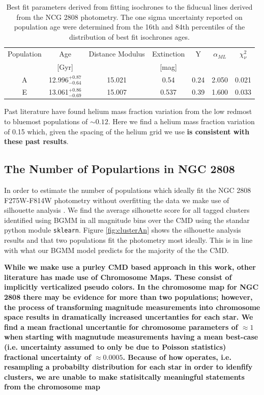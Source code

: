 \begin{table}
  \centering
  \begin{tabular}{c | c c c c c c}
    \hline
    Population & Age & Distance Modulus & Extinction & Y & $\alpha_{ML}$ & $\chi^{2}_{\nu}$\\
    & [Gyr] & & [mag] & & &\\
    \hline
    \hline
    A & 12.996$^{+0.87}_{-0.64}$ & 15.021 & 0.54 & 0.24 & 2.050 & 0.021\\
    E & 13.061$^{+0.86}_{-0.69}$ & 15.007 & 0.537 & 0.39 & 1.600 & 0.033 \\
    \hline
  \end{tabular}
  \caption{Best fit parameters derived from fitting isochrones to the fiducual lines derived from the NCG 2808 photometry. The one sigma uncertainty reported on population age were determined from the 16th and 84th percentiles of the distribution of best fit isochrones ages.}
  \label{tab:BestFitResults}
\end{table}


Past literature \citep[e.g. ][]{Milone2015, Milone2018} have found helium mass
fraction variation from the low redmost to bluemost populations of $\sim 0.12$.
Here we find a helium mass fraction variation of 0.15 which, given the spacing
of the helium grid we use \textbf{is consistent with these past results}.

\subsection{The Number of Populartions in NGC 2808}
In order to estimate the number of populations which ideally fit the NGC 2808
F275W-F814W photometry without overfitting the data we make use of silhouette
analysis \citep[][and in a similar manner to how \citet{Valle2022} preform
their analysis of spectroscopic data]{ROUSSEEUW198753}. We find the average
silhouette score for all tagged clusters identified using BGMM in all magnitude
bins over the CMD using the standar python module \texttt{sklearn}. Figure
\ref{fig:clusterAn} shows the silhouette analysis results and that two
populations fit the photometry most ideally. This is in line with what our BGMM
model predicts for the majority of the the CMD.

{\bf While we make use a purley CMD based approach in this work, other
literature has made use of Chromosome Maps. These consist of implicitly
verticalized pseudo colors. In the chromosome map for NGC 2808 there may be
evidence for more than two populations; however, the process of transforming
magnitude measurements into chromosome space results in dramatically increased
uncertanties for each star. We find a mean fractional uncertantie for
chromosome parameters of $\approx1$ when starting with magnutude
measurements having a mean best-case (i.e. uncertainty assumed to only be due
to Poisson statistics) fractional uncertainty of $\approx 0.0005$. Because of
how \fidanka operates, i.e. resampling a probabilty distribution for each star
in order to idenfify clusters, we are unable to make statisitcally meaningful
statements from the chromosome map}

